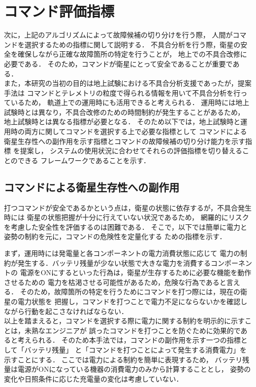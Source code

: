 \documentclass[11pt]{jsreport}
\begin{document}
\newpage
\section{コマンド評価指標}
次に，上記のアルゴリズムによって故障候補の切り分けを行う際，
人間がコマンドを選択するための指標に関して説明する．
不具合分析を行う際，衛星の安全を確保しながら正確な故障箇所の特定を行うことが，
地上での不具合改修に必要である．
そのため，コマンドが衛星にとって安全であることが重要である．\\
また，本研究の当初の目的は地上試験における不具合分析支援であったが，提案手法は
コマンドとテレメトリの粒度で得られる情報を用いて不具合分析を行っているため，
軌道上での運用時にも活用できると考えられる．
運用時には地上試験時とは異なり，不具合改修のための時間制約が発生することがあるため，
地上試験時とは異なる指標が必要となる．
そのため以下では，地上試験時と運用時の両方に関してコマンドを選択する上で必要な指標として
コマンドによる衛星生存性への副作用を示す指標とコマンドの故障候補の切り分け能力を示す指標
を提案し，
システムの使用状況に合わせてそれらの評価指標を切り替えることのできる
フレームワークであることを示す．

\subsection{コマンドによる衛星生存性への副作用}
打つコマンドが安全であるかという点は，衛星の状態に依存するが，不具合発生時には
衛星の状態把握が十分に行えていない状況であるため，
網羅的にリスクを考慮した安全性を評価するのは困難である．
そこで，以下では簡単に電力と姿勢の制約を元に，コマンドの危険性を定量化する
ための指標を示す．

まず，運用時には発電量と各コンポーネントの電力消費状態に応じて
電力の制約が発生する．バッテリ残量が少ない状態で大きな電力を消費するコンポーネントの
電源をONにするといった行為は，衛星が生存するために必要な機能を動作させるための
電力を枯渇させる可能性があるため，危険な行為であると言える．
そのため，故障箇所の特定を行うためにコマンドを打つ際には，現在の衛星の電力状態を
把握し，コマンドを打つことで電力不足にならないかを確認しながら行動を起こさなければならない．\\
以上を踏まえると，コマンドを選択する際に電力に関する制約を明示的に示すことは，未熟なエンジニアが
誤ったコマンドを打つことを防ぐために効果的であると考えられる．
そのため本手法では，コマンドの副作用を示す一つの指標として「バッテリ残量」
と「コマンドを打つことによって発生する消費電力」を示すことにする．
ここでは電力による制約を簡単に表現するため，
バッテリ残量は電源がONになっている機器の消費電力のみから計算することとし，
姿勢の変化や日照条件に応じた充電量の変化は考慮していない．
\end{document}
